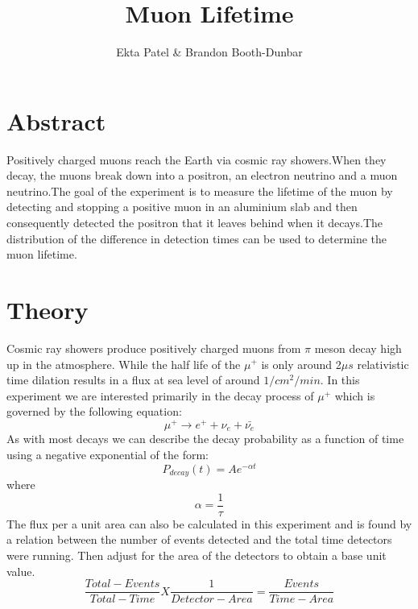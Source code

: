 
\newcommand{\ig}[2][width=4in]{\texttt{[image: \#2]}}    		
\usepackage{graphicx}					
\usepackage{amssymb}
\usepackage{pgfplotstable}
\usepackage{float}
\usepackage{caption}
\captionsetup[table]{justification=justified,singlelinecheck=false, position=bottom}


\header {\today}							
\title{Muon Lifetime}
\author{Ekta Patel \& Brandon Booth-Dunbar}

\section{Abstract}
\begin{em} Positively charged muons reach the Earth via cosmic ray showers.When they decay, the muons break down into a positron, an electron neutrino and a muon neutrino.The goal of the experiment is to measure the lifetime of the muon by detecting and stopping a positive muon in an aluminium slab and then consequently detected the positron that it leaves behind when it decays.The distribution of the difference in detection times can be used to determine the muon lifetime.
\end{em}

\section{Theory}
\indent \indent Cosmic ray showers produce positively charged muons from $\pi$ meson decay high up in the atmosphere. While the half life of the $\mu^+$ is only around 2$\mu s$ relativistic time dilation results in a flux at sea level of around $1/cm^2/min$.  In this experiment we are interested primarily in the decay process of $\mu^+$ which is governed by the following equation:
\begin{equation}
	\mu^+ \rightarrow e^+ + \nu_e + \bar{\nu_e}
\end{equation}
\indent \indent As with most decays we can describe the decay probability as a function of time using a negative exponential of the form:
\begin{equation}
P_{decay}(t) = A e^{-\alpha t}
\end{equation}
\indent \indent \indent \indent where 
\begin{equation}
\alpha = \frac{1}{\tau}
\end{equation}
\indent \indent The flux per a unit area can also be calculated in this experiment and is found by a relation between the number of events detected and the total time detectors were running. Then adjust for the area of the detectors to obtain a base unit value. 
\begin{equation}
\frac{Total-Events}{Total-Time} X \frac{1}{Detector-Area} = \frac{Events}{Time-Area}
\end{equation}



